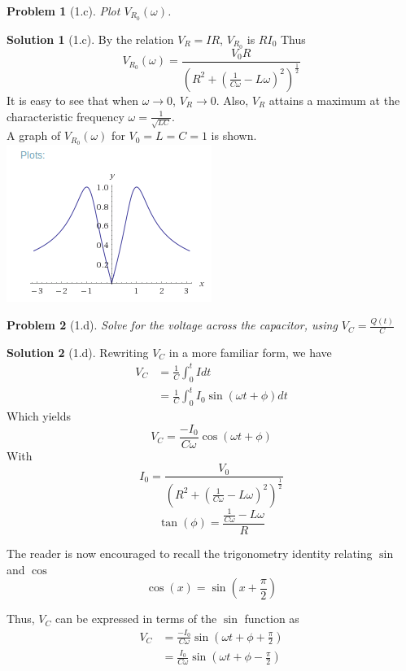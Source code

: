 \documentclass[12pt]{article}
\newtheorem*{problem}{Problem}
\theoremstyle{definition}
\newtheorem*{solution}{Solution}
\begin{document}
\setcounter{equation}{0}
\begin{problem}[1.c]
Plot $V_{R_0}(\omega)$.
\end{problem}

\begin{solution}[1.c]

By the relation $V_R = IR$, $V_{R_0}$ is $RI_0$
Thus
\begin{equation}
V_{R_0}(\omega) = \frac{V_0R}{(R^2 + (\frac{1}{C\omega}-L\omega)^2)^{\frac{1}{2}}}
\end{equation}
It is easy to see that when $\omega \to 0$, $V_R \to 0$. 
Also, $V_R$ attains a maximum at the characteristic frequency $\omega = \frac{1}{\sqrt{LC}}$.\\

A graph of $V_{R_0}(\omega)$ for $V_0 = L = C = 1$ is shown.\\
\includegraphics[scale=0.7]{RLC_res_voltage}

\end{solution}

\setcounter{equation}{0}
\begin{problem}[1.d]
Solve for the voltage across the capacitor, using $V_C = \frac{Q(t)}{C}$
\end{problem}

\begin{solution}[1.d]

Rewriting $V_C$ in a more familiar form, we have
\[
\begin{aligned}
V_C & = \frac{1}{C}\int_0^t I dt\\
    & = \frac{1}{C}\int_0^t I_0 \sin(\omega t + \phi)dt
\end{aligned}
\]
Which yields
\[
V_C = \frac{-I_0}{C\omega}\cos(\omega t + \phi)
\]
With
\begin{equation}
I_0         = \frac{V_0}{(R^2 + (\frac{1}{C\omega}-L\omega)^2)^{\frac{1}{2}}}
\end{equation}
\begin{equation}
\tan(\phi)  = \frac{\frac{1}{C\omega}-L\omega}{R}
\end{equation}

The reader is now encouraged to recall the trigonometry identity relating $\sin$ and $\cos$
\[
\cos(x) = \sin(x + \frac{\pi}{2})
\]

Thus, $V_C$ can be expressed in terms of the $\sin$ function as 
\[
\begin{aligned}
V_C & = \frac{-I_0}{C\omega}\sin(\omega t + \phi + \frac{\pi}{2})\\
    & = \frac{I_0}{C\omega}\sin(\omega t + \phi - \frac{\pi}{2})
\end{aligned}
\]
\end{solution}
\end{document}
